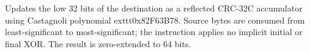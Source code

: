 Updates the low 32 bits of the destination as a reflected CRC-32C accumulator using Castagnoli polynomial
	exttt{0x82F63B78}. Source bytes are consumed from least-significant to most-significant; the instruction applies
no implicit initial or final XOR. The result is zero-extended to 64 bits.
